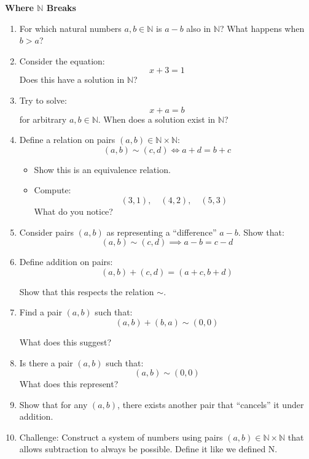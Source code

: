 \documentclass[11pt]{article}
\newcommand{\N}{\mathbb{N}}
\begin{document}
\begin{problembox}

\textbf{Where $\N$ Breaks}

\begin{enumerate}

\item For which natural numbers $a,b \in \N$ is $a - b$ also in $\N$?  
What happens when $b > a$?

\item Consider the equation:
\[
x + 3 = 1
\]
Does this have a solution in $\N$?

\item Try to solve:
\[
x + a = b
\]
for arbitrary $a,b \in \N$.  
When does a solution exist in $\N$?

\item Define a relation on pairs $(a,b) \in \N \times \N$:
\[
(a,b) \sim (c,d) \iff a + d = b + c
\]

\begin{itemize}
\item Show this is an equivalence relation.
\item Compute:
\[
(3,1), \quad (4,2), \quad (5,3)
\]
What do you notice?
\end{itemize}

\item Consider pairs $(a,b)$ as representing a “difference” $a - b$.  
Show that:
\[
(a,b) \sim (c,d) \implies a - b = c - d
\]

\item Define addition on pairs:
\[
(a,b) + (c,d) = (a+c, b+d)
\]

Show that this respects the relation $\sim$.

\item Find a pair $(a,b)$ such that:
\[
(a,b) + (b,a) \sim (0,0)
\]

What does this suggest?

\item Is there a pair $(a,b)$ such that:
\[
(a,b) \sim (0,0)
\]
What does this represent?

\item Show that for any $(a,b)$, there exists another pair that “cancels” it under addition.

\item Challenge:  
Construct a system of numbers using pairs $(a,b) \in \N \times \N$ 
that allows subtraction to always be possible. Define it like we defined N.

\end{enumerate}

\end{problembox}
\end{document}
